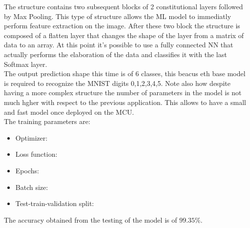 \documentclass[12pt]{report}
\begin{document}

The structure contains two subsequent blocks of 2 constitutional layers followed by Max Pooling. This type of structure allows the ML model to immediatly perform feature extraction on the image. After these two block the structure is composed of a flatten layer that changes the shape of the layer from a matrix of data to an array. At this point it's possible to use a fully connected NN that actually performs the elaboration of the data and classifies it with the last Softmax layer. \\
The output prediction shape this time is of 6 classes, this beacus eth base model is required to recognize the MNIST digits 0,1,2,3,4,5. Note also how despite having a more complex structure the number of parameters in the model is not much hgher with respect to the previous application. This allows to have a small and fast model once deployed on the MCU. \\
The training parameters are:
\begin{itemize}
	\item Optimizer:
	\item Loss function:
	\item Epochs:
	\item Batch size: 
	\item Test-train-validation split: 
\end{itemize}

The accuracy obtained from the testing of the model is of $99.35\%$.

\end{document}
